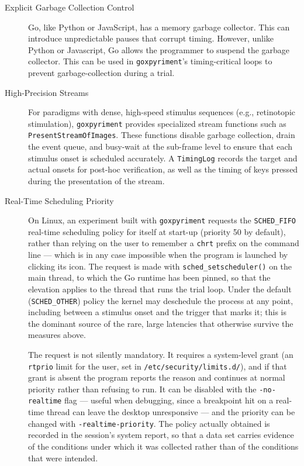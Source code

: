 \documentclass[doc,a4paper,floatsintext]{apa7}
\begin{document}
\begin{description}
\item[Explicit Garbage Collection Control] Go, like Python or
  JavaScript, has a memory garbage collector. This can introduce
  unpredictable pauses that corrupt timing. However, unlike Python or
  Javascript, Go allows the programmer to suspend the garbage
  collector.  This can be used in \texttt{goxpyriment}'s
  timing-critical loops to prevent garbage-collection during a trial.

\item[High-Precision Streams] For paradigms with dense, high-speed
  stimulus sequences (e.g., retinotopic stimulation),
  \texttt{goxpyriment} provides specialized stream functions such as
  \texttt{PresentStreamOfImages}. These functions disable garbage
  collection, drain the event queue, and busy-wait at the sub-frame
  level to ensure that each stimulus onset is scheduled accurately. A
  \texttt{TimingLog} records the target and actual onsets for post-hoc
  verification, as well as the timing of keys pressed during the
  presentation of the stream.

\item[Real-Time Scheduling Priority] On Linux, an experiment built with
  \texttt{goxpyriment} requests the \texttt{SCHED\_FIFO} real-time
  scheduling policy for itself at start-up (priority 50 by default),
  rather than relying on the user to remember a \texttt{chrt} prefix on
  the command line --- which is in any case impossible when the program
  is launched by clicking its icon. The request is made with
  \texttt{sched\_setscheduler()} on the main thread, to which the Go
  runtime has been pinned, so that the elevation applies to the thread
  that runs the trial loop. Under the default (\texttt{SCHED\_OTHER})
  policy the kernel may deschedule the process at any point, including
  between a stimulus onset and the trigger that marks it; this is the
  dominant source of the rare, large latencies that otherwise survive
  the measures above.

  The request is not silently mandatory. It requires a system-level
  grant (an \texttt{rtprio} limit for the user, set in
  \texttt{/etc/security/limits.d/}), and if that grant is absent the
  program reports the reason and continues at normal priority rather
  than refusing to run. It can be disabled with the
  \texttt{-no-realtime} flag --- useful when debugging, since a
  breakpoint hit on a real-time thread can leave the desktop
  unresponsive --- and the priority can be changed with
  \texttt{-realtime-priority}. The policy actually obtained is recorded
  in the session's system report, so that a data set carries evidence of
  the conditions under which it was collected rather than of the
  conditions that were intended.
\end{description}
\end{document}
